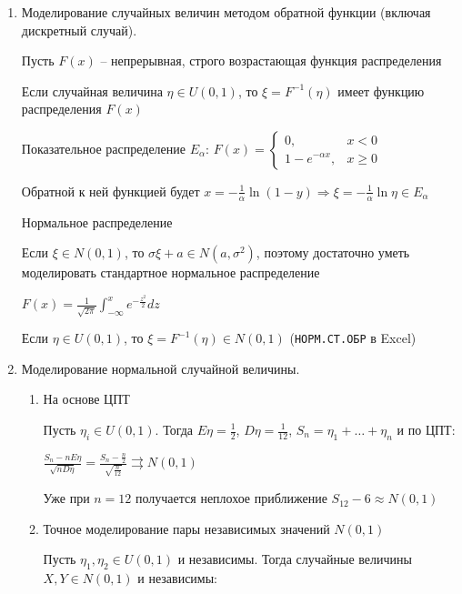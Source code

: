 \begin{enumerate}
    \item Моделирование случайных величин методом обратной функции (включая дискретный случай).

    \begin{MyTheorem}
        \Ths Пусть $F(x)$ -- непрерывная, строго возрастающая функция распределения

        Если случайная величина $\eta \in U(0, 1)$, то $\xi = F^{-1}(\eta)$ имеет функцию распределения $F(x)$
    \end{MyTheorem}

    \Ex Показательное распределение $E_\alpha$: $F(x) = \begin{cases}0, & x < 0 \\ 1 - e^{-\alpha x}, & x \geq 0\end{cases}$

    Обратной к ней функцией будет $x = -\frac{1}{\alpha} \ln (1 - y) \Longrightarrow \xi = -\frac{1}{\alpha} \ln \eta \in E_\alpha$

    \Ex Нормальное распределение

    Если $\xi \in N(0, 1)$, то $\sigma \xi + a \in N(a, \sigma^2)$, поэтому достаточно уметь моделировать стандартное нормальное распределение

    $F(x) = \frac{1}{\sqrt{2\pi}} \int_{-\infty}^x e^{-\frac{z^2}{2}} dz$

    Если $\eta \in U(0, 1)$, то $\xi = F^{-1}(\eta) \in N(0, 1)$ (\texttt{НОРМ.СТ.ОБР} в Excel)

    \item Моделирование нормальной случайной величины.

    \begin{enumerate}[label*=\Roman*. ]
        \item На основе ЦПТ

        Пусть $\eta_i \in U(0, 1)$. Тогда $E\eta = \frac{1}{2}$, $D\eta = \frac{1}{12}$, $S_n = \eta_1 + \dots + \eta_n$ и по ЦПТ:

        $\frac{S_n - nE\eta}{\sqrt{n D\eta}} = \frac{S_n - \frac{n}{2}}{\sqrt{\frac{n}{12}}} \rightrightarrows N(0, 1)$

        Уже при $n = 12$ получается неплохое приближение $S_{12} - 6 \approx N(0, 1)$ 

        \item Точное моделирование пары независимых значений $N(0, 1)$

        \begin{MyTheorem}
            Пусть $\eta_1, \eta_2 \in U(0, 1)$ и независимы. Тогда случайные величины $X, Y \in N(0, 1)$ и независимы:


\end{MyTheorem}
\end{enumerate}
\end{enumerate}
